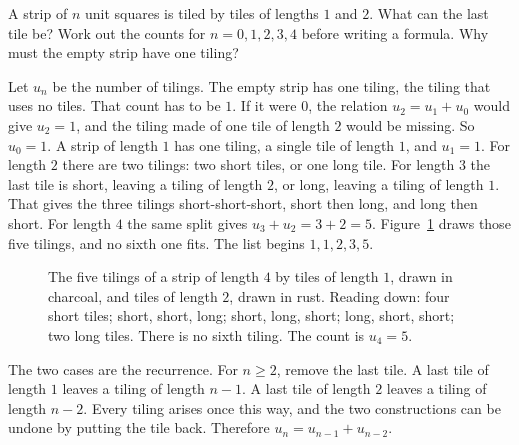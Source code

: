 \begin{think}
A strip of $n$ unit squares is tiled by tiles of lengths $1$ and $2$. What can the last tile be? Work out the counts for $n=0,1,2,3,4$ before writing a formula. Why must the empty strip have one tiling?
\end{think}

Let $u_n$ be the number of tilings. The empty strip has one tiling, the tiling that uses no tiles. That count has to be $1$. If it were $0$, the relation $u_2=u_1+u_0$ would give $u_2=1$, and the tiling made of one tile of length $2$ would be missing. So $u_0=1$. A strip of length $1$ has one tiling, a single tile of length $1$, and $u_1=1$. For length $2$ there are two tilings: two short tiles, or one long tile. For length $3$ the last tile is short, leaving a tiling of length $2$, or long, leaving a tiling of length $1$. That gives the three tilings short-short-short, short then long, and long then short. For length $4$ the same split gives $u_3+u_2=3+2=5$. Figure~\ref{fig:tiles} draws those five tilings, and no sixth one fits. The list begins $1,1,2,3,5$.

\begin{figure}[ht]
\centering
{}
\caption{The five tilings of a strip of length $4$ by tiles of length $1$, drawn in charcoal, and tiles of length $2$, drawn in rust. Reading down: four short tiles; short, short, long; short, long, short; long, short, short; two long tiles. There is no sixth tiling. The count is $u_4=5$.}
\label{fig:tiles}
\end{figure}

The two cases are the recurrence. For $n\ge 2$, remove the last tile. A last tile of length $1$ leaves a tiling of length $n-1$. A last tile of length $2$ leaves a tiling of length $n-2$. Every tiling arises once this way, and the two constructions can be undone by putting the tile back. Therefore $u_n=u_{n-1}+u_{n-2}$.

